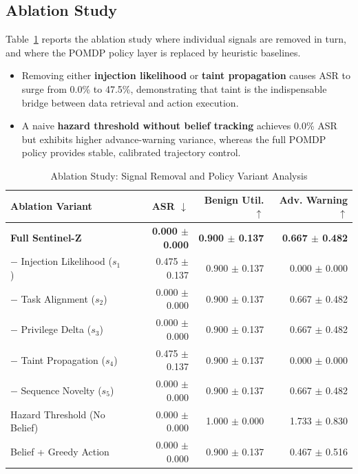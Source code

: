 \documentclass[conference]{IEEEtran}
\begin{document}
\subsection{Ablation Study}
Table~\ref{tab:t2} reports the ablation study where individual signals are removed in turn, and where the POMDP policy layer is replaced by heuristic baselines.
\begin{itemize}
    \item Removing either \textbf{injection likelihood} or \textbf{taint propagation} causes ASR to surge from 0.0\% to 47.5\%, demonstrating that taint is the indispensable bridge between data retrieval and action execution.
    \item A naive \textbf{hazard threshold without belief tracking} achieves 0.0\% ASR but exhibits higher advance-warning variance, whereas the full POMDP policy provides stable, calibrated trajectory control.
\end{itemize}

\begin{table}[t]
\caption{Ablation Study: Signal Removal and Policy Variant Analysis}
\label{tab:t2}
\centering
\scriptsize
\setlength{\tabcolsep}{2.5pt}
\begin{tabular}{lrrr}
\toprule
\textbf{Ablation Variant} & \textbf{ASR} $\downarrow$ & \textbf{Benign Util.} $\uparrow$ & \textbf{Adv. Warning} $\uparrow$ \\
\midrule
\textbf{Full Sentinel-Z} & \textbf{0.000 $\pm$ 0.000} & \textbf{0.900 $\pm$ 0.137} & \textbf{0.667 $\pm$ 0.482} \\
$-$ Injection Likelihood ($s_1$) & 0.475 $\pm$ 0.137 & 0.900 $\pm$ 0.137 & 0.000 $\pm$ 0.000 \\
$-$ Task Alignment ($s_2$) & 0.000 $\pm$ 0.000 & 0.900 $\pm$ 0.137 & 0.667 $\pm$ 0.482 \\
$-$ Privilege Delta ($s_3$) & 0.000 $\pm$ 0.000 & 0.900 $\pm$ 0.137 & 0.667 $\pm$ 0.482 \\
$-$ Taint Propagation ($s_4$) & 0.475 $\pm$ 0.137 & 0.900 $\pm$ 0.137 & 0.000 $\pm$ 0.000 \\
$-$ Sequence Novelty ($s_5$) & 0.000 $\pm$ 0.000 & 0.900 $\pm$ 0.137 & 0.667 $\pm$ 0.482 \\
\midrule
Hazard Threshold (No Belief) & 0.000 $\pm$ 0.000 & 1.000 $\pm$ 0.000 & 1.733 $\pm$ 0.830 \\
Belief + Greedy Action & 0.000 $\pm$ 0.000 & 0.900 $\pm$ 0.137 & 0.467 $\pm$ 0.516 \\
\bottomrule
\end{tabular}
\end{table}
\end{document}
